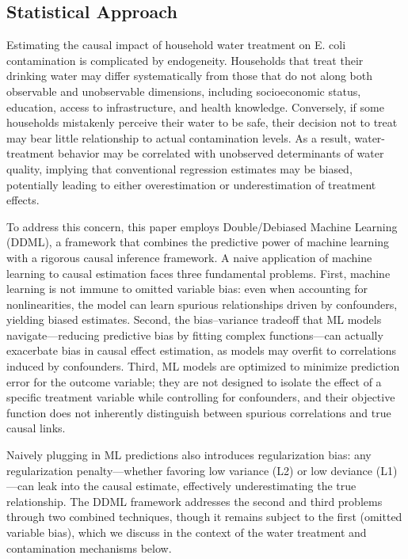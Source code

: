 \documentclass [11pt]{article}
\theoremstyle{plain}
\theoremstyle{definition}
\theoremstyle{remark}
\newcommand{\1}{\bm{1}}
\begin{document}
\subsection{Statistical Approach}

Estimating the causal impact of household water treatment on E. coli contamination is complicated by endogeneity. Households that treat their drinking water may differ systematically from those that do not along both observable and unobservable dimensions, including socioeconomic status, education, access to infrastructure, and health knowledge. Conversely, if some households mistakenly perceive their water to be safe, their decision not to treat may bear little relationship to actual contamination levels. As a result, water-treatment behavior may be correlated with unobserved determinants of water quality, implying that conventional regression estimates may be biased, potentially leading to either overestimation or underestimation of treatment effects.

To address this concern, this paper employs Double/Debiased Machine Learning (DDML), a framework that combines the predictive power of machine learning with a rigorous causal inference framework. A naive application of machine learning to causal estimation faces three fundamental problems. First, machine learning is not immune to omitted variable bias: even when accounting for nonlinearities, the model can learn spurious relationships driven by confounders, yielding biased estimates. Second, the bias--variance tradeoff that ML models navigate---reducing predictive bias by fitting complex functions---can actually exacerbate bias in causal effect estimation, as models may overfit to correlations induced by confounders. Third, ML models are optimized to minimize prediction error for the outcome variable; they are not designed to isolate the effect of a specific treatment variable while controlling for confounders, and their objective function does not inherently distinguish between spurious correlations and true causal links.

Naively plugging in ML predictions also introduces regularization bias: any regularization penalty---whether favoring low variance (L2) or low deviance (L1)---can leak into the causal estimate, effectively underestimating the true relationship. The DDML framework addresses the second and third problems through two combined techniques, though it remains subject to the first (omitted variable bias), which we discuss in the context of the water treatment and contamination mechanisms below.
\end{document}

